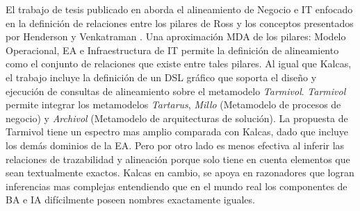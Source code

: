 El trabajo de tesis publicado en \cite{Moya:2012} aborda el alineamiento de Negocio e IT enfocado en la definici\'on de relaciones entre los pilares de Ross \cite{Ross:2006} y los conceptos presentados por Henderson y Venkatraman \cite{henderson:1990}. Una aproximaci\'on MDA de los pilares: Modelo Operacional, EA e Infraestructura de IT permite la definici\'on de alineamiento como el conjunto de relaciones que existe entre tales pilares. Al igual que Kalcas, el trabajo incluye la definici\'on de un DSL gr\'afico que soporta el dise\~no y ejecuci\'on de consultas de alineamiento sobre el metamodelo \textit{Tarmivol}. \textit{Tarmivol} permite integrar los metamodelos \textit{Tartarus}, \textit{Millo} (Metamodelo de procesos de negocio) y \textit{Archivol} (Metamodelo de arquitecturas de soluci\'on). La propuesta de Tarmivol tiene un espectro mas amplio comparada con Kalcas, dado que incluye los dem\'as dominios de la EA. Pero por otro lado es menos efectiva al inferir las relaciones de trazabilidad y alineaci\'on  porque solo tiene en cuenta elementos que sean textualmente exactos. Kalcas en cambio, se apoya en razonadores que logran inferencias mas complejas entendiendo que en el mundo real los componentes de BA e IA dif\'icilmente poseen nombres exactamente iguales.
